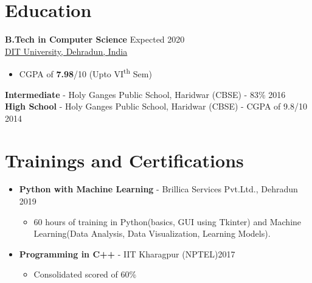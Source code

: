 \documentclass[a4paper, margin, centered]{res}
\begin{document}
\vspace{-7mm}
\begin{resume}

\section{Education}
\textbf{B.Tech in Computer Science} \hfill Expected 2020 \\
\href{http://dituniversity.edu.in/}{DIT University, Dehradun, India}
\begin{itemize}
 \item CGPA of  \textbf{7.98}/10 (Upto VI\textsuperscript{th} Sem)
\end{itemize}
\textbf{Intermediate} - {Holy Ganges Public School, Haridwar} (CBSE) - 83\% \hfill 2016 \\
\textbf{High School} - {Holy Ganges Public School, Haridwar} (CBSE) -  CGPA of 9.8/10 \hfill 2014 


\section{Trainings \hspace{2mm} and \hspace{12mm} Certifications}
\begin{itemize}[leftmargin=*]
 \item \textbf{Python with Machine Learning} - Brillica Services Pvt.Ltd., Dehradun \hfill 2019
 \begin{itemize}[leftmargin=*]
	\item 60 hours of training in Python(basics, GUI using Tkinter) and Machine Learning(Data Analysis, Data Visualization, Learning Models). 
 \end{itemize}
 \item \textbf{Programming in C++} - IIT Kharagpur (NPTEL)\hfill 2017
 \begin {itemize}[leftmargin=*]
	\item Consolidated scored of 60\% 
 \end{itemize}
\end{itemize}


\end{resume}
\end{document}
